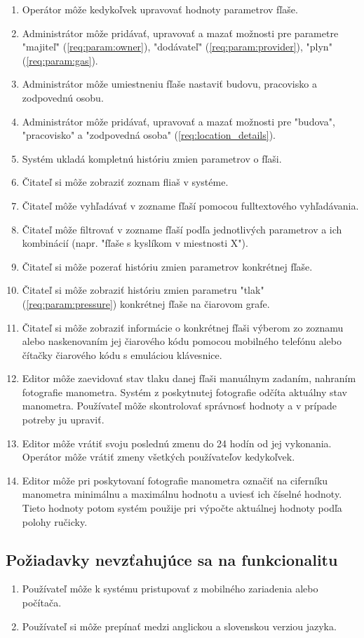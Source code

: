 \documentclass{zah}
\begin{document}
\begin{enumerate}
\item Operátor môže kedykoľvek upravovať hodnoty parametrov fľaše.
\item Administrátor môže pridávať, upravovať a mazať možnosti pre parametre "majiteľ" (\ref{req:param:owner}), "dodávateľ" (\ref{req:param:provider}), "plyn" (\ref{req:param:gas}).
\item \label{req:location_details} Administrátor môže umiestneniu fľaše nastaviť budovu, pracovisko a zodpovednú osobu.
\item Administrátor môže pridávať, upravovať a mazať možnosti pre "budova", "pracovisko" a "zodpovedná osoba" (\ref{req:location_details}).
\item \label{req:history} Systém ukladá kompletnú históriu zmien parametrov o fľaši.
\item Čitateľ si môže zobraziť zoznam fliaš v systéme.
\item Čitateľ môže vyhľadávať v zozname fľaší pomocou fulltextového vyhľadávania.
\item Čitateľ môže filtrovať v zozname fľaší podľa jednotlivých parametrov a ich kombinácií (napr. "fľaše s kyslíkom v miestnosti X").
\item Čitateľ si môže pozerať históriu zmien parametrov konkrétnej fľaše.
\item Čitateľ si môže zobraziť históriu zmien parametru "tlak" (\ref{req:param:pressure}) konkrétnej fľaše na čiarovom grafe.
\item Čitateľ si môže zobraziť informácie o konkrétnej fľaši výberom zo zoznamu alebo naskenovaním jej čiarového kódu pomocou mobilného telefónu alebo čítačky čiarového kódu s emuláciou klávesnice.
\item Editor môže zaevidovať stav tlaku danej fľaši manuálnym zadaním, nahraním fotografie manometra.
Systém z poskytnutej fotografie odčíta aktuálny stav manometra. Používateľ môže skontrolovať správnosť hodnoty a v prípade potreby ju upraviť.
\item Editor môže vrátiť svoju poslednú zmenu do 24 hodín od jej vykonania. Operátor môže vrátiť zmeny všetkých používateľov kedykoľvek.
\item Editor môže pri poskytovaní fotografie manometra označiť na ciferníku manometra minimálnu a maximálnu hodnotu a uviesť ich číselné hodnoty. Tieto hodnoty potom systém použije pri výpočte aktuálnej hodnoty podľa polohy ručicky.
\end{enumerate}

\subsection{Požiadavky nevzťahujúce sa na funkcionalitu}

\begin{enumerate}
\item Používateľ môže k systému pristupovať z mobilného zariadenia alebo počítača.
\item Používateľ si môže prepínať medzi anglickou a slovenskou verziou jazyka.
\end{enumerate}


\end{document}
